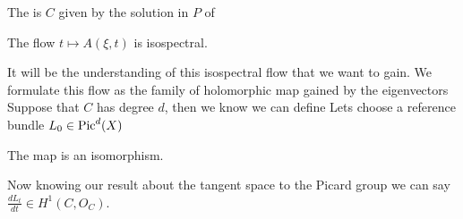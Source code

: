 \documentclass{article}
\begin{document}
\begin{definition}
	The  is $C$ given by the solution in $P$ of 
\end{definition}

\begin{prop}
	The flow $t \mapsto A(\xi,t)$ is isospectral.
\end{prop}

It will be the understanding of this isospectral flow that we want to gain. We formulate this flow as the family of holomorphic map gained by the eigenvectors 
Suppose that $C$ has degree $d$, then we know we can define 
Lets choose a reference bundle $L_0 \in \operatorname{Pic}^d(X)$ 
\begin{lemma}
	The map 
is an isomorphism. 
\end{lemma}
Now knowing our result about the tangent space to the Picard group we can say $\frac{dL_t}{dt} \in H^1(C,O_C)$. 


\end{document}
